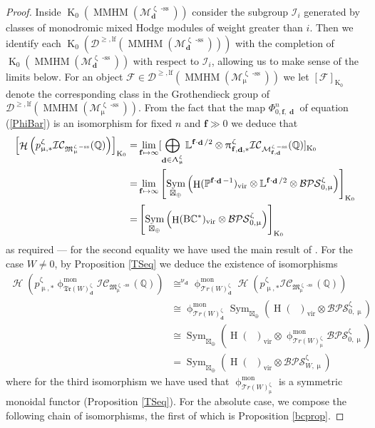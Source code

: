\documentclass[a4paper,10pt]{amsart}
\renewcommand{\zeta}{\upzeta}
\renewcommand{\pi}{\uppi\hspace{0.05em}}
\renewcommand{\Lambda}{\Uplambda}
\renewcommand{\phi}{\upphi}
\renewcommand{\nu}{\upnu}
\renewcommand{\mu}{\upmu}
\DeclareMathOperator{\BC}{B\mathbb{C}^*}
\newcommand{\ff}{\mathbf{f}}
\newcommand{\LL}{\mathbb{L}}
\newcommand{\WW}{\mathcal{T}r(W)}
\newcommand{\WWW}{\mathfrak{Tr}(W)}
\newcommand{\Mst}{\mathfrak{M}}
\newcommand{\Msp}{\mathcal{M}}
\newcommand{\ICS}{\mathcal{IC}}
\newcommand{\DTS}{\mathcal{BPS}}
\newcommand{\phim}[1]{\phi^{\mon}_{#1}}
\DeclareMathOperator{\sst}{-ss}
\DeclareMathOperator{\FreeComm}{Sym}
\DeclareMathOperator{\mon}{mon}
\DeclareMathOperator{\MMHM}{MMHM}
\DeclareMathOperator{\Ka}{K}
\DeclareMathOperator{\dd}{\mathbf{d}}
\DeclareMathOperator{\Sym}{Sym}
\DeclareMathOperator{\vir}{vir}
\DeclareMathOperator{\Ho}{\mathcal{H}}
\DeclareMathOperator{\HO}{H}
\newcommand{\Dulf}{\mathcal{D}^{\geq, \mathrm{lf}}}
\begin{document}
\begin{proof}
Inside $\Ka_0(\MMHM(\Msp^{\zeta\sst}_{\dd}))$ consider the subgroup $\mathcal{I}_i$ generated by classes of monodromic mixed Hodge modules of weight greater than $i$.  Then we identify each $\Ka_0(\Dulf(\MMHM(\Msp^{\zeta\sst}_{\dd})))$ with the completion of $\Ka_0(\MMHM(\Msp^{\zeta\sst}_{\dd}))$ with respect to $\mathcal{I}_i$, allowing us to make sense of the limits below.  For an object $\mathcal{F}\in \Dulf(\MMHM(\Msp^{\zeta\sst}_{\mu}))$ we let $[\mathcal{F}]_{\Ka_0}$ denote the corresponding class in the Grothendieck group of $\Dulf(\MMHM(\Msp^{\zeta\sst}_{\mu}))$.  From the fact that the map $\Phi^n_{0,\ff,\dd }$ of equation (\ref{PhiBar}) is an isomorphism for fixed $n$ and $\ff\gg 0$ we deduce that
\begin{align*}
\left[\Ho\left(p^{\zeta}_{\mu,*}\ICS_{\Mst^{\zeta\sst}_{\mu}}(\mathbb{Q})\right)\right]_{\Ka_0}=&\lim_{\ff\mapsto \infty}[\bigoplus_{\dd\in\Lambda_{\mu}^{\zeta}}\LL^{\ff\cdot \dd/2}\otimes\pi _{\ff,\dd ,*}^{\zeta}\ICS_{\Msp_{\ff,\dd }^{\zeta\sst}}(\mathbb{Q})]_{\Ka_0}\\=&\lim_{\ff\mapsto\infty}\left[\FreeComm_{\boxtimes_{\oplus}}\left(\HO(\mathbb{P}^{\ff\cdot \dd-1})_{\vir}\otimes\LL^{\ff\cdot \dd/2}\otimes \DTS_{0,\mu}^{\zeta}\right)\right]_{\Ka_0}\\=&\left[\Sym_{\boxtimes_{\oplus}}\left(\HO(\BC)_{\vir}\otimes \DTS^{\zeta}_{0,\mu}\right)\right]_{\Ka_0}
\end{align*}
as required  --- for the second equality we have used the main result of \cite{Meinhardt14}.  
\smallbreak
For the case $W\neq 0$, by Proposition \ref{TSeq} we deduce the existence of isomorphisms
\begin{align*}
\Ho\left(p^{\zeta}_{\mu,*}\phim{\WWW^{\zeta}_{\dd}}\ICS_{\Mst^{\zeta\sst}_{\mu}}(\mathbb{Q})\right)&\cong^{\nu_{\dd}}\phim{\WW^{\zeta}_{\dd}}\Ho\left(p^{\zeta}_{\mu,*}\ICS_{\Mst^{\zeta\sst}_{\mu}}(\mathbb{Q})\right)\\
&\cong \phim{\WW^{\zeta}_{\dd}}\FreeComm_{\boxtimes_{\oplus}}\left(\HO(\BC)_{\vir}\otimes\DTS^{\zeta}_{0,\mu}\right)\\
&\cong \FreeComm_{\boxtimes_{\oplus}}\left(\HO(\BC)_{\vir}\otimes \phim{\WW^{\zeta}_{\mu}}\DTS^{\zeta}_{0,\mu}\right)\\
&= \FreeComm_{\boxtimes_{\oplus}}\left(\HO(\BC)_{\vir}\otimes \DTS^{\zeta}_{W,\mu}\right)
\end{align*}
where for the third isomorphism we have used that $\phim{\WW_{\mu}^{\zeta}}$ is a symmetric monoidal functor (Proposition \ref{TSeq}).  
\smallbreak
For the absolute case, we compose the following chain of isomorphisms, the first of which is Proposition \ref{bcprop}.

\end{proof}
\end{document}
